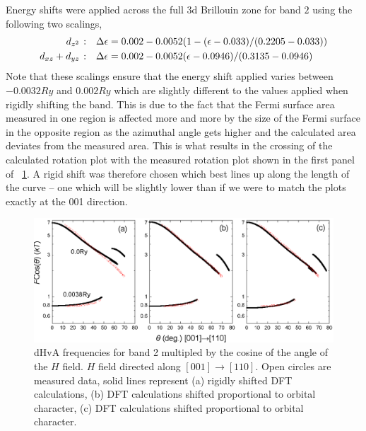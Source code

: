 Energy shifts were applied across the full $3$d Brillouin zone for band $2$ using the following two scalings,
\begin{align*}
\textrm{\DzTwo:}\quad \Delta\epsilon &= 0.002 - 0.0052 (1 - (\epsilon - 0.033)/(0.2205 - 0.033)) \\
\textrm{\DxzDyz:}\quad \Delta\epsilon &= 0.002 - 0.0052 (\epsilon - 0.0946)/(0.3135 - 0.0946)
\end{align*}
Note that these scalings ensure that the energy shift applied varies between $-0.0032\unit{Ry}$ and $0.002\unit{Ry}$ which are slightly different to the values applied when rigidly shifting the band. This is due to the fact that the Fermi surface area measured in one region is affected more and more by the size of the Fermi surface in the opposite region as the azimuthal angle gets higher and the calculated area deviates from the measured area. This is what results in the crossing of the calculated rotation plot with the measured rotation plot shown in the first panel of \fig~\ref{Fig:3:Band2DCharacterRigidComparison}. A rigid shift was therefore chosen which best lines up along the length of the curve -- one which will be slightly lower than if we were to match the plots exactly at the 001 direction.

\begin{figure}[h!]
    \begin{center}
        \includegraphics[scale=0.7]{Chapter3-dHvABaFe2P2/Figures/AngleDepMeasurements/BandCharacterRotPlot/Band2_110_RotPlot_Comparison}
        \caption{dHvA frequencies for band 2 multipled by the cosine of the angle of the $H$ field. $H$ field directed along $[001]\rightarrow[110]$. Open circles are measured data, solid lines represent (a) rigidly shifted DFT calculations, (b) DFT calculations shifted proportional to \DzTwo orbital character, (c) DFT calculations shifted proportional to \DxzDyz orbital character.}
        \label{Fig:3:Band2DCharacterRigidComparison}
    \end{center}
\end{figure}

